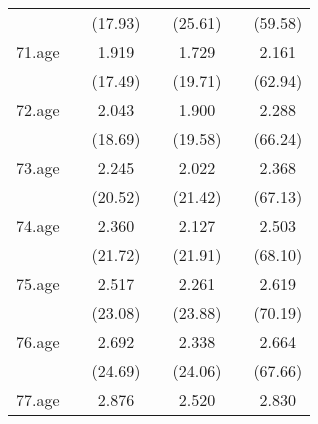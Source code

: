 {\begin{tabular}{l*{6}{c}}
            &                     &     (17.93)         &                     &     (25.61)         &                     &     (59.58)         \\
[1em]
71.age      &                     &       1.919\sym{***}&                     &       1.729\sym{***}&                     &       2.161\sym{***}\\
            &                     &     (17.49)         &                     &     (19.71)         &                     &     (62.94)         \\
[1em]
72.age      &                     &       2.043\sym{***}&                     &       1.900\sym{***}&                     &       2.288\sym{***}\\
            &                     &     (18.69)         &                     &     (19.58)         &                     &     (66.24)         \\
[1em]
73.age      &                     &       2.245\sym{***}&                     &       2.022\sym{***}&                     &       2.368\sym{***}\\
            &                     &     (20.52)         &                     &     (21.42)         &                     &     (67.13)         \\
[1em]
74.age      &                     &       2.360\sym{***}&                     &       2.127\sym{***}&                     &       2.503\sym{***}\\
            &                     &     (21.72)         &                     &     (21.91)         &                     &     (68.10)         \\
[1em]
75.age      &                     &       2.517\sym{***}&                     &       2.261\sym{***}&                     &       2.619\sym{***}\\
            &                     &     (23.08)         &                     &     (23.88)         &                     &     (70.19)         \\
[1em]
76.age      &                     &       2.692\sym{***}&                     &       2.338\sym{***}&                     &       2.664\sym{***}\\
            &                     &     (24.69)         &                     &     (24.06)         &                     &     (67.66)         \\
[1em]
77.age      &                     &       2.876\sym{***}&                     &       2.520\sym{***}&                     &       2.830\sym{***}\\

\end{tabular}}
